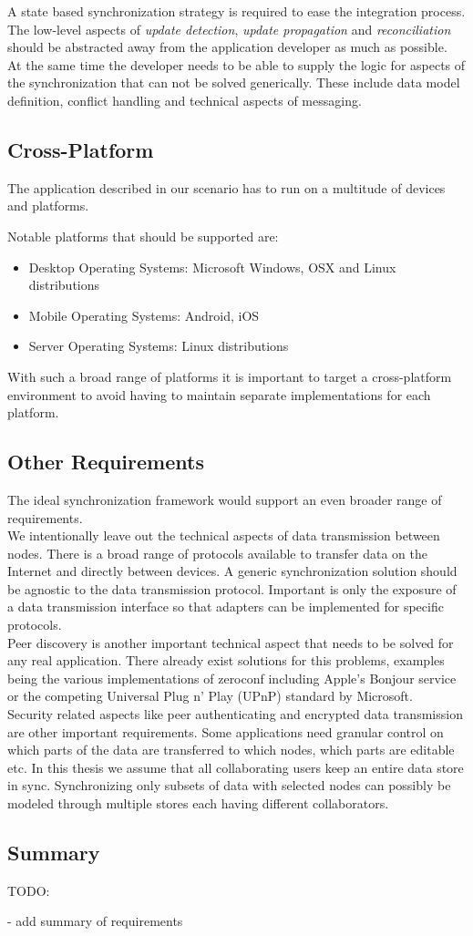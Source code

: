 A state based synchronization strategy is required to ease the integration process. The low-level aspects of \emph{update detection}, \emph{update propagation} and \emph{reconciliation} should be abstracted away from the application developer as much as possible.\\
At the same time the developer needs to be able to supply the logic for aspects of the synchronization that can not be solved generically. These include data model definition, conflict handling and technical aspects of messaging.

\subsection{Cross-Platform}
The application described in our scenario has to run on a multitude of devices and platforms.

Notable platforms that should be supported are:

\begin{itemize}
\item Desktop Operating Systems: Microsoft Windows, OSX and Linux distributions
\item Mobile Operating Systems: Android, iOS
\item Server Operating Systems: Linux distributions
\end{itemize}

With such a broad range of platforms it is important to target a cross-platform environment to avoid having to maintain separate implementations for each platform.

\subsection{Other Requirements}
The ideal synchronization framework would support an even broader range of requirements.\\
We intentionally leave out the technical aspects of data transmission between nodes.
There is a broad range of protocols available to transfer data on the Internet and directly between devices.
A generic synchronization solution should be agnostic to the data transmission protocol.
Important is only the exposure of a data transmission interface so that adapters can be implemented for specific protocols.\\
Peer discovery is another important technical aspect that needs to be solved for any real application.
There already exist solutions for this problems, examples being the various implementations of zeroconf \cite{gunes2002ip} including Apple's Bonjour service or the competing Universal Plug n' Play (UPnP) \cite{miller2001home} standard by Microsoft.\\
Security related aspects like peer authenticating and encrypted data transmission are other important requirements.
Some applications need granular control on which parts of the data are transferred to which nodes, which parts are editable etc.
In this thesis we assume that all collaborating users keep an entire data store in sync.
Synchronizing only subsets of data with selected nodes can possibly be modeled through multiple stores each having different collaborators.

\subsection{Summary}

TODO:

- add summary of requirements
